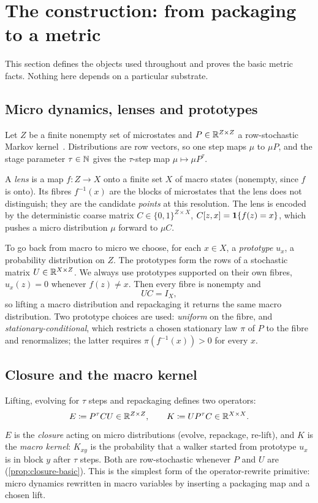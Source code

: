 \section{The construction: from packaging to a metric}
\label{sec:construction}

This section defines the objects used throughout and proves the basic metric facts.
Nothing here depends on a particular substrate.

\subsection{Micro dynamics, lenses and prototypes}

Let $Z$ be a finite nonempty set of microstates and $P\in\mathbb{R}^{Z\times Z}$ a row-stochastic Markov kernel~\cite{Norris1997}.
Distributions are row vectors, so one step maps $\mu$ to $\mu P$, and the stage parameter $\tau\in\mathbb{N}$ gives the $\tau$-step map $\mu\mapsto\mu P^{\tau}$.

A \emph{lens} is a map $f\colon Z\to X$ onto a finite set $X$ of macro states (nonempty, since $f$ is onto).
Its fibres $f^{-1}(x)$ are the blocks of microstates that the lens does not distinguish; they are the candidate \emph{points} at this resolution.
The lens is encoded by the deterministic coarse matrix $C\in\{0,1\}^{Z\times X}$, $C[z,x]=\mathbf{1}\{f(z)=x\}$, which pushes a micro distribution $\mu$ forward to $\mu C$.

To go back from macro to micro we choose, for each $x\in X$, a \emph{prototype} $u_x$, a probability distribution on $Z$.
The prototypes form the rows of a stochastic matrix $U\in\mathbb{R}^{X\times Z}$.
We always use prototypes supported on their own fibres, $u_x(z)=0$ whenever $f(z)\neq x$.
Then every fibre is nonempty and
\begin{equation}
UC=I_X,
\label{eq:UC}
\end{equation}
so lifting a macro distribution and repackaging it returns the same macro distribution.
Two prototype choices are used: \emph{uniform} on the fibre, and \emph{stationary-conditional}, which restricts a chosen stationary law $\pi$ of $P$ to the fibre and renormalizes; the latter requires $\pi(f^{-1}(x))>0$ for every $x$.

\subsection{Closure and the macro kernel}

Lifting, evolving for $\tau$ steps and repackaging defines two operators:
\begin{equation}
E \coloneqq P^{\tau}CU \in\mathbb{R}^{Z\times Z},
\qquad
K \coloneqq UP^{\tau}C \in\mathbb{R}^{X\times X}.
\label{eq:closure-macro}
\end{equation}
$E$ is the \emph{closure} acting on micro distributions (evolve, repackage, re-lift), and $K$ is the \emph{macro kernel}: $K_{xy}$ is the probability that a walker started from prototype $u_x$ is in block $y$ after $\tau$ steps.
Both are row-stochastic whenever $P$ and $U$ are (\cref{prop:closure-basic}).
This is the simplest form of the operator-rewrite primitive: micro dynamics rewritten in macro variables by inserting a packaging map and a chosen lift.

